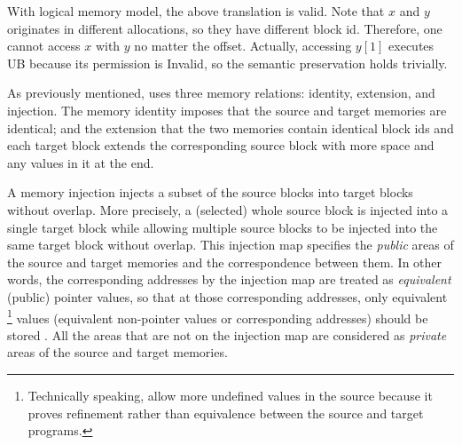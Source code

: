 With logical memory model, the above translation is valid.
Note that $x$ and $y$ originates in different allocations, so they have different block id.
Therefore, one cannot access $x$ with $y$ no matter the offset.
Actually, accessing $y[1]$ executes UB because its permission is \textrm{Invalid}, so the semantic preservation holds trivially.



\label{sec:overview-verification:injection:original}
As previously mentioned, \cc{} uses three memory relations: identity, extension, and injection.
The memory identity imposes that the source and target memories are identical;
and the extension that the two memories contain identical block ids and
each target block extends the corresponding source block
with more space and any values in it at the end.

A memory injection injects a subset of the source blocks into target blocks
without overlap. More precisely, a (selected) whole source block is injected into a single target block
while allowing multiple source blocks to be injected into the same target block without overlap.
This injection map specifies the \emph{public} areas of the source and target memories and the correspondence between them.
In other words, the corresponding addresses by the injection map are treated as \emph{equivalent} (public) pointer values,
so that at those corresponding addresses,
only equivalent%
\footnote{Technically speaking, \cc{} allow more undefined values in the source
  because it proves refinement rather than equivalence between the source and target programs.}
values (\ie equivalent non-pointer values or corresponding addresses) should be stored .
All the areas that are not on the injection map are considered as \emph{private} areas of the source and target memories.


